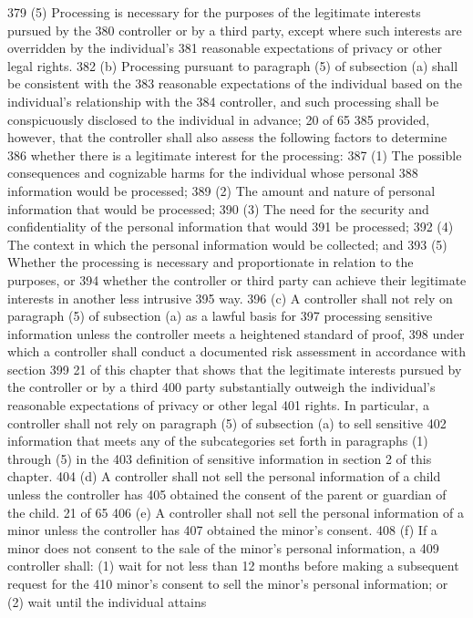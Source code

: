 379 (5) Processing is necessary for the purposes of the legitimate interests pursued by the
380 controller or by a third party, except where such interests are overridden by the individual’s
381 reasonable expectations of privacy or other legal rights.
382 (b) Processing pursuant to paragraph (5) of subsection (a) shall be consistent with the
383 reasonable expectations of the individual based on the individual’s relationship with the
384 controller, and such processing shall be conspicuously disclosed to the individual in advance;
20 of 65
385 provided, however, that the controller shall also assess the following factors to determine
386 whether there is a legitimate interest for the processing:
387 (1) The possible consequences and cognizable harms for the individual whose personal
388 information would be processed;
389 (2) The amount and nature of personal information that would be processed;
390 (3) The need for the security and confidentiality of the personal information that would
391 be processed;
392 (4) The context in which the personal information would be collected; and
393 (5) Whether the processing is necessary and proportionate in relation to the purposes, or
394 whether the controller or third party can achieve their legitimate interests in another less intrusive
395 way.
396 (c) A controller shall not rely on paragraph (5) of subsection (a) as a lawful basis for
397 processing sensitive information unless the controller meets a heightened standard of proof,
398 under which a controller shall conduct a documented risk assessment in accordance with section
399 21 of this chapter that shows that the legitimate interests pursued by the controller or by a third
400 party substantially outweigh the individual’s reasonable expectations of privacy or other legal
401 rights. In particular, a controller shall not rely on paragraph (5) of subsection (a) to sell sensitive
402 information that meets any of the subcategories set forth in paragraphs (1) through (5) in the
403 definition of sensitive information in section 2 of this chapter.
404 (d) A controller shall not sell the personal information of a child unless the controller has
405 obtained the consent of the parent or guardian of the child.
21 of 65
406 (e) A controller shall not sell the personal information of a minor unless the controller has
407 obtained the minor’s consent.
408 (f) If a minor does not consent to the sale of the minor’s personal information, a
409 controller shall: (1) wait for not less than 12 months before making a subsequent request for the
410 minor’s consent to sell the minor’s personal information; or (2) wait until the individual attains
